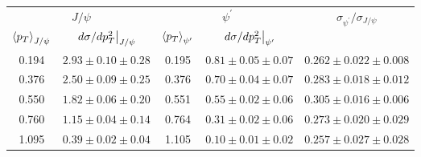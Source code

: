 \begin{tabular}{cc|cc|c}
\hline
\multicolumn{2}{c|}{$J/\psi$}                     & \multicolumn{2}{c|}{$\psi^{\prime}$}              & \multirow{2}{*}{$\sigma_{\psi^\prime}/\sigma_{J/\psi}$} \\ \cline{1-4}
$\expval{p_T}_{J/\psi}$ & $\eval{d\sigma/dp_T^2}_{J/\psi}$ & $\expval{p_T}_{\psi^\prime}$ & $\eval{d\sigma/dp_T^2}_{\psi^\prime}$ &  \\ \hline
\multicolumn{1}{c|}{0.194} & $2.93\pm0.10\pm0.28$ & \multicolumn{1}{c|}{0.195} & $0.81\pm0.05\pm0.07$ & $0.262\pm0.022\pm0.008$                                 \\
\multicolumn{1}{c|}{0.376} & $2.50\pm0.09\pm0.25$ & \multicolumn{1}{c|}{0.376} & $0.70\pm0.04\pm0.07$ & $0.283\pm0.018\pm0.012$                                 \\
\multicolumn{1}{c|}{0.550} & $1.82\pm0.06\pm0.20$ & \multicolumn{1}{c|}{0.551} & $0.55\pm0.02\pm0.06$ & $0.305\pm0.016\pm0.006$                                 \\
\multicolumn{1}{c|}{0.760} & $1.15\pm0.04\pm0.14$ & \multicolumn{1}{c|}{0.764} & $0.31\pm0.02\pm0.06$ & $0.273\pm0.020\pm0.029$                                 \\
\multicolumn{1}{c|}{1.095} & $0.39\pm0.02\pm0.04$ & \multicolumn{1}{c|}{1.105} & $0.10\pm0.01\pm0.02$ & $0.257\pm0.027\pm0.028$                                 \\ \hline
\end{tabular}
